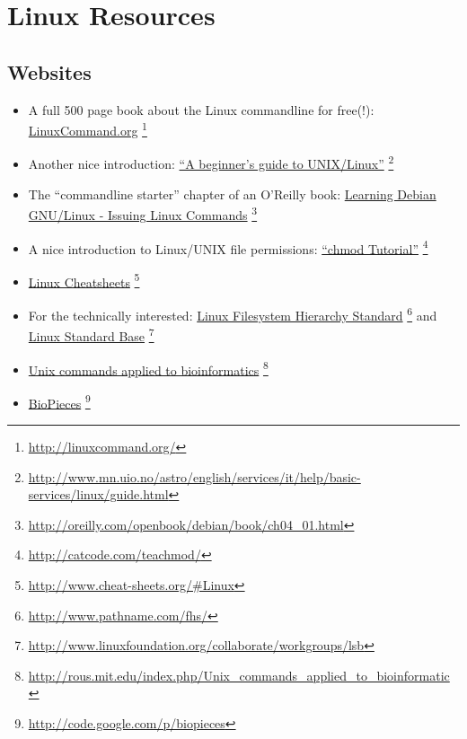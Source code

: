 \documentclass[a4paper,11pt,english]{sphinxmanual}
\begin{document}
\section{Linux Resources}
\label{ReadingList:linux-resources}

\subsection{Websites}
\label{ReadingList:websites}\begin{itemize}
\item {} 
A full 500 page book about the Linux commandline for free(!): \href{http://linuxcommand.org/}{LinuxCommand.org} \footnote{
\href{http://linuxcommand.org/}{http://linuxcommand.org/}
}

\item {} 
Another nice introduction: \href{http://www.mn.uio.no/astro/english/services/it/help/basic-services/linux/guide.html}{``A beginner's guide to UNIX/Linux''} \footnote{
\href{http://www.mn.uio.no/astro/english/services/it/help/basic-services/linux/guide.html}{http://www.mn.uio.no/astro/english/services/it/help/basic-services/linux/guide.html}
}

\item {} 
The ``commandline starter'' chapter of an O'Reilly book: \href{http://oreilly.com/openbook/debian/book/ch04\_01.html}{Learning Debian GNU/Linux - Issuing Linux Commands} \footnote{
\href{http://oreilly.com/openbook/debian/book/ch04\_01.html}{http://oreilly.com/openbook/debian/book/ch04\_01.html}
}

\item {} 
A nice introduction to Linux/UNIX file permissions: \href{http://catcode.com/teachmod/}{``chmod Tutorial''} \footnote{
\href{http://catcode.com/teachmod/}{http://catcode.com/teachmod/}
}

\item {} 
\href{http://www.cheat-sheets.org/\#Linux}{Linux Cheatsheets} \footnote{
\href{http://www.cheat-sheets.org/\#Linux}{http://www.cheat-sheets.org/\#Linux}
}

\item {} 
For the technically interested:
\href{http://www.pathname.com/fhs/}{Linux Filesystem Hierarchy Standard} \footnote{
\href{http://www.pathname.com/fhs/}{http://www.pathname.com/fhs/}
} and
\href{http://www.linuxfoundation.org/collaborate/workgroups/lsb}{Linux Standard Base} \footnote{
\href{http://www.linuxfoundation.org/collaborate/workgroups/lsb}{http://www.linuxfoundation.org/collaborate/workgroups/lsb}
}

\item {} 
\href{http://rous.mit.edu/index.php/Unix\_commands\_applied\_to\_bioinformatic}{Unix commands applied to bioinformatics} \footnote{
\href{http://rous.mit.edu/index.php/Unix\_commands\_applied\_to\_bioinformatic}{http://rous.mit.edu/index.php/Unix\_commands\_applied\_to\_bioinformatic}
}

\item {} 
\href{http://code.google.com/p/biopieces}{BioPieces} \footnote{
\href{http://code.google.com/p/biopieces}{http://code.google.com/p/biopieces}
}

\end{itemize}
\end{document}
